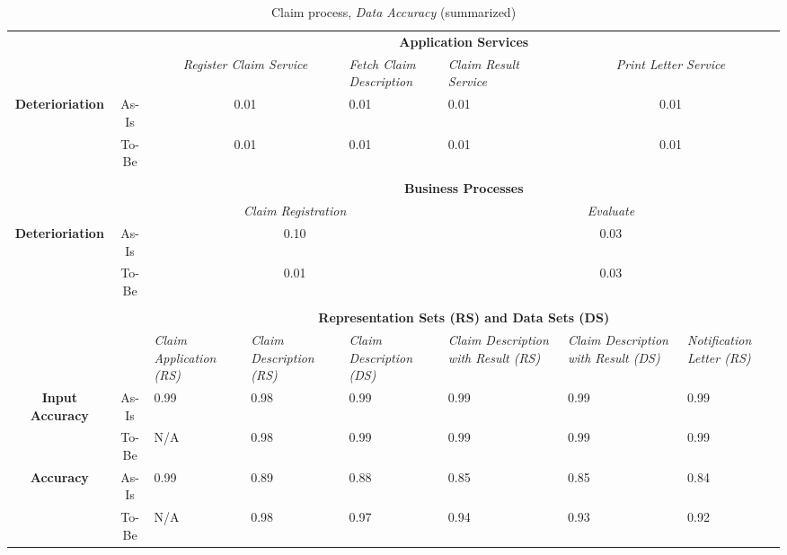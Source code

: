 \begin{center}
\begin{table}[H]
\begin{tabular}{|c|c|p{1.5cm}|p{1.5cm}|p{1.5cm}|p{1.5cm}|p{1.5cm}|p{1.7cm}|}



\cline{3-8}

	\multicolumn{2}{c|}{} & \multicolumn{6}{c|}{\textbf{Application Services}} \\ \cline{3-8}
	\multicolumn{2}{c|}{} & \multicolumn{2}{c|}{\textsl{Register Claim Service}} & \textsl{Fetch Claim Description} & \textsl{Claim Result Service} & \multicolumn{2}{c|}{\textsl{Print Letter Service}} \\ \hline
	\multirow{2}{*}{\textbf{Deterioriation}} & As-Is & \multicolumn{2}{c|}{0.01} & 0.01 & 0.01 & \multicolumn{2}{c|}{0.01} \\ \cline{2-8}
	& To-Be & \multicolumn{2}{c|}{0.01} & 0.01 & 0.01 & \multicolumn{2}{c|}{0.01} \\ \hline


	\multicolumn{8}{c}{} \\ \cline{3-8}
	\multicolumn{2}{c|}{} & \multicolumn{6}{c|}{\textbf{Business Processes}} \\ \cline{3-8}
	\multicolumn{2}{c|}{} & \multicolumn{3}{c|}{\textsl{Claim Registration}} & \multicolumn{3}{c|}{\textsl{Evaluate}} \\ \hline
	\multirow{2}{*}{\textbf{Deterioriation}} & As-Is & \multicolumn{3}{c|}{0.10} & \multicolumn{3}{c|}{0.03} \\ \cline{2-8}
	& To-Be & \multicolumn{3}{c|}{0.01} & \multicolumn{3}{c|}{0.03} \\ \hline

	\multicolumn{8}{c}{} \\ \cline{3-8}
	\multicolumn{2}{c|}{} & \multicolumn{6}{c|}{\textbf{Representation Sets (RS) and Data Sets (DS)}} \\ \cline{3-8}
	\multicolumn{2}{c|}{} & \textsl{Claim Application (RS)} & \textsl{Claim Description (RS)} & \textsl{Claim Description (DS)} & \textsl{Claim Description with Result (RS)} & \textsl{Claim Description with Result (DS)} & \textsl{Notification Letter (RS)}\\
	\hline
	\multirow{2}{*}{\textbf{Input Accuracy}} & As-Is & 0.99 & 0.98 & 0.99 & 0.99 & 0.99 & 0.99\\ \cline{3-8} \cline{2-2}
	& To-Be & N/A & 0.98 & 0.99 & 0.99 & 0.99 & 0.99\\ \hline
	\multirow{2}{*}{\textbf{Accuracy}} & As-Is & 0.99 & 0.89 & 0.88 & 0.85 & 0.85 & 0.84\\ \cline{3-8} \cline{2-2}
	& To-Be & N/A &0.98 & 0.97 & 0.94 & 0.93 & 0.92\\ \hline


\end{tabular}
\caption{Claim process, \textsl{Data Accuracy} (summarized)}
\label{tab:claim_both}
\end{table}
\end{center}